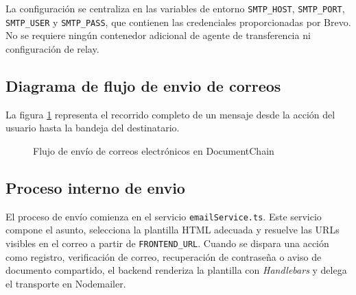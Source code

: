 \documentclass[11pt, a4paper]{article}
\begin{document}
La configuraci\'{o}n se centraliza en las variables de entorno \texttt{SMTP\_HOST}, \texttt{SMTP\_PORT}, \texttt{SMTP\_USER} y \texttt{SMTP\_PASS}, que contienen las credenciales proporcionadas por Brevo. No se requiere ning\'{u}n contenedor adicional de agente de transferencia ni configuraci\'{o}n de relay.

\subsection{Diagrama de flujo de envio de correos}

La figura \ref{fig:flujo-correo} representa el recorrido completo de un mensaje desde la acci\'{o}n del usuario hasta la bandeja del destinatario.

\begin{figure}[H]
\centering
{}
\caption{Flujo de env\'{i}o de correos electr\'{o}nicos en DocumentChain}
\label{fig:flujo-correo}
\end{figure}

\subsection{Proceso interno de envio}

El proceso de env\'{i}o comienza en el servicio \texttt{emailService.ts}. Este servicio compone el asunto, selecciona la plantilla HTML adecuada y resuelve las URLs visibles en el correo a partir de \texttt{FRONTEND\_URL}. Cuando se dispara una acci\'{o}n como registro, verificaci\'{o}n de correo, recuperaci\'{o}n de contrase\~{n}a o aviso de documento compartido, el backend renderiza la plantilla con \textit{Handlebars} y delega el transporte en Nodemailer.
\end{document}
